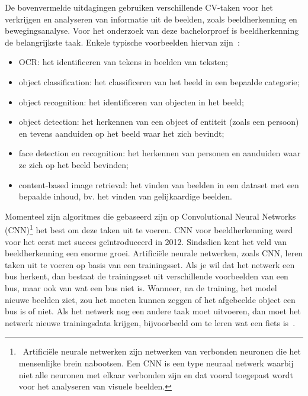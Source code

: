 De bovenvermelde uitdagingen gebruiken verschillende CV-taken voor het verkrijgen en analyseren van informatie uit de beelden, zoals beeldherkenning en bewegingsanalyse. Voor het onderzoek van deze bachelorproef is beeldherkenning de belangrijkste taak. Enkele typische voorbeelden hiervan zijn~\autocite{wikiCV}:
\begin{itemize}
	\item OCR: het identificeren van tekens in beelden van teksten;
	\item object classification: het classificeren van het beeld in een bepaalde categorie;
	\item object recognition: het identificeren van objecten in het beeld;
	\item object detection: het herkennen van een object of entiteit (zoals een persoon) en tevens aanduiden op het beeld waar het zich bevindt;
	\item face detection en recognition: het herkennen van personen en aanduiden waar ze zich op het beeld bevinden;
	\item content-based image retrieval: het vinden van beelden in een dataset met een bepaalde inhoud, bv. het vinden van gelijkaardige beelden.
\end{itemize}


Momenteel zijn algoritmes die gebaseerd zijn op Convolutional Neural Networks (CNN)\footnote{~Artificiële neurale netwerken zijn netwerken van verbonden neuronen die het mensenlijke brein nabootsen. Een CNN is een type neuraal netwerk waarbij niet alle neuronen met elkaar verbonden zijn en dat vooral toegepast wordt voor het analyseren van visuele beelden.} het best om deze taken uit te voeren. CNN voor beeldherkenning werd voor het eerst met succes geïntroduceerd in 2012. Sindsdien kent het veld van beeldherkenning een enorme groei. Artifici\"{e}le neurale netwerken, zoals CNN, leren taken uit te voeren op basis van een trainingsset. Als je wil dat het netwerk een bus herkent, dan bestaat de trainingsset uit verschillende voorbeelden van een bus, maar ook van wat een bus niet is. Wanneer, na de training, het model nieuwe beelden ziet, zou het moeten kunnen zeggen of het afgebeelde object een bus is of niet. Als het netwerk nog een andere taak moet uitvoeren, dan moet het netwerk nieuwe trainingsdata krijgen, bijvoorbeeld om te leren wat een fiets is~\autocite{Pokharna2016}. 

